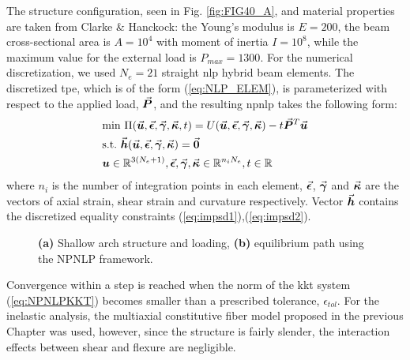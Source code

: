 The structure configuration, seen in Fig. \ref{fig:FIG40_A}, and material 
properties are 
taken from Clarke \& Hanckock\cite{Clarke:1990}: the Young's modulus is 
$E=200$, the beam cross-sectional area is $A= 10^4$ with moment of inertia 
$I=10^8$, while the maximum value for the external load is $P_{max}=1300$.
For the numerical discretization, we used $N_e=21$ straight \acrshort{nlp} 
hybrid beam elements. The discretized \acrshort{tpe}, which is of the 
form (\ref{eq:NLP_ELEM}), is parameterized with respect to the applied load, 
$\vec{\bm{P}}$, and the resulting \acrshort{npnlp} takes the following form:
\begin{align}
	&\text{min}\
	\Pi(\bvec{u},\bvec{\epsilon},\bvec{\gamma},\bvec{\kappa},t)=U(\bvec{u},\bvec{\epsilon},
	\bvec{\gamma},\bvec{\kappa})-t\bvec{P}^T\bvec{u}\label{eq:PiEX4}\\
	&\text{s.t.}\ 
	\bvec{h}(\bvec{u},\bvec{\epsilon},\bvec{\gamma},\bvec{\kappa})=\bvec{0}\nonumber\\
	&\bm{u}\in\mathbb{R}^{3(N_e+1)},
	\bvec{\epsilon},\bvec{\gamma},\bvec{\kappa}\in\mathbb{R}^{n_iN_e},
	t\in\mathbb{R}\nonumber
\end{align}
\nonumber where $n_i$ is the number of integration points in each element,
$\vec{\bm{\epsilon}}$, $\vec{\bm{\gamma}}$ and $\vec{\bm{\kappa}}$ are the vectors of axial 
strain,
shear strain and curvature respectively. Vector $\vec{\bm{h}}$ contains the 
discretized equality constraints (\ref{eq:impsd1}),(\ref{eq:impsd2}).

\begin{figure*}[t]
	\centering
	\qquad
	\caption{\textbf{(a)} Shallow arch structure and loading, \textbf{(b)}
		equilibrium path using the NPNLP framework.}%
	\label{fig:FIG40}%
\end{figure*}

Convergence within 
a step is reached when the norm of the \acrshort{kkt} system 
(\ref{eq:NPNLPKKT}) becomes smaller than a prescribed tolerance, 
$\epsilon_{tol}$. For the inelastic analysis, the multiaxial constitutive fiber 
model proposed in the previous Chapter was used, however, since the structure 
is fairly slender, the interaction effects between shear and flexure are 
negligible.

